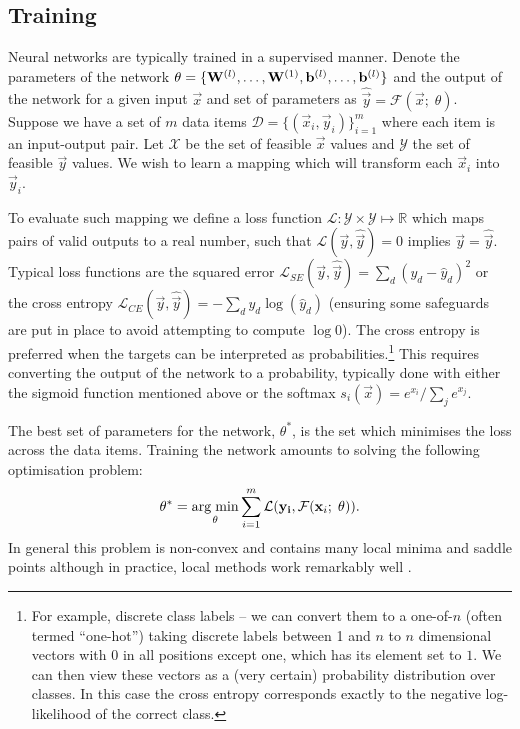 \subsection{Training}
Neural networks are typically trained in a supervised manner. Denote the parameters of the network
\(\theta = \{\mathbf{W}^{(l)}, \ldots, \mathbf{W}^{(1)}, \mathbf{b}^{(l)}, \ldots, \mathbf{b}^{(l)}\}\) and
the output of the network for a given input \(\vec{x}\) and set of parameters as 
\(\hat{\vec{y}} = \mathcal{F}(\vec{x};\; \theta)\). Suppose we have a set of \(m\) data items
\(\mathcal{D} = \{(\vec{x}_i, \vec{y}_i)\}_{i=1}^m\) where each item is an input-output pair. 
Let \(\mathcal{X}\) be the set of feasible \(\vec{x}\) values and \(\mathcal{Y}\) the set of
feasible \(\vec{y}\) values.
We
wish to learn a mapping which will transform each  \(\vec{x}_i\) into \(\vec{y}_i\).

To evaluate such mapping we define a loss function
\(\mathcal{L} : \mathcal{Y} \times \mathcal{Y} \mapsto \mathbb{R}\) which maps pairs of valid outputs
to a real number, such that \(\mathcal{L}(\vec{y}, \hat{\vec{y}}) = 0\) implies 
\(\vec{y} = \hat{\vec{y}}\). Typical loss functions are the squared error
\( \label{eq:squarederror}
	\mathcal{L}_{SE}(\vec{y}, \hat{\vec{y}}) 
	= \sum_d (y_d - \hat{y}_d)^2
\) or the cross entropy
\(
	\mathcal{L}_{CE}(\vec{y}, \hat{\vec{y}}) = -\sum_d y_d \log(\hat{y}_d)
\) (ensuring some safeguards are put in place to avoid attempting to compute \(\log 0\)).
The cross entropy is preferred when the targets can be interpreted as
probabilities.\footnote{For example, discrete class labels -- we can convert them to a one-of-\(n\)
(often termed ``one-hot'') taking discrete labels between 1 and \(n\) to \(n\) dimensional vectors
with \(0\) in all positions except one, which has its element set to \(1\). We can then view these
vectors as a (very certain) probability distribution over classes. In this case the cross entropy
corresponds exactly to the negative log-likelihood of the correct class.} This requires converting
the output of the network to a probability, typically done with either the sigmoid function 
mentioned above or the softmax \(s_i(\vec{x}) = e^{x_i}/\sum_j e^{x_j}\).

The best set of parameters for the network, \(\theta^*\), is the set which minimises the
loss across the data items. Training the network amounts to solving the following
optimisation problem:
\begin{equation}\label{eq:nnoptimise}
	\theta^* = 
	\operatorname*{arg\;min}_{\theta} \sum_{i=1}^m \mathcal{L}(\mathbf{y_i}, \mathcal{F}(\mathbf{x}_i;\; \theta)).
\end{equation} In general this problem is non-convex and contains many local minima and saddle points
\autocite{Dauphin2014, Kawaguchi2016} although in practice, local methods work remarkably well
\autocite{Goodfellow2015}.

